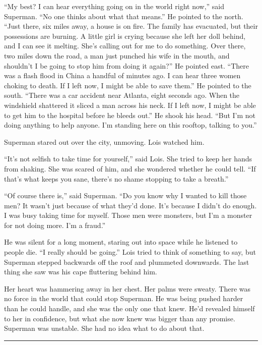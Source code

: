 \documentclass[ebook,12pt]{memoir}
\begin{document}
``My best? I can hear everything going on in the world right now,'' said
Superman. ``No one thinks about what that means.'' He pointed to the
north. ``Just there, six miles away, a house is on fire. The family has
evacuated, but their possessions are burning. A little girl is crying
because she left her doll behind, and I can see it melting. She's
calling out for me to do something. Over there, two miles down the road,
a man just punched his wife in the mouth, and shouldn't I be going to
stop him from doing it again?'' He pointed east. ``There was a flash
flood in China a handful of minutes ago. I can hear three women choking
to death. If I left now, I might be able to save them.'' He pointed to
the south. ``There was a car accident near Atlanta, eight seconds ago.
When the windshield shattered it sliced a man across his neck. If I left
now, I might be able to get him to the hospital before he bleeds out.''
He shook his head. ``But I'm not doing anything to help anyone. I'm
standing here on this rooftop, talking to you.''

Superman stared out over the city, unmoving. Lois watched him.

``It's not selfish to take time for yourself,'' said Lois. She tried to
keep her hands from shaking. She was scared of him, and she wondered
whether he could tell. ``If that's what keeps you sane, there's no shame
stopping to take a breath.''

``Of course there is,'' said Superman. ``Do you know why I wanted to
kill those men? It wasn't just because of what they'd done. It's because
I didn't do enough. I was busy taking time for myself. Those men were
monsters, but I'm a monster for not doing more. I'm a fraud.''

He was silent for a long moment, staring out into space while he
listened to people die. ``I really should be going.'' Lois tried to
think of something to say, but Superman stepped backwards off the roof
and plummeted downwards. The last thing she saw was his cape fluttering
behind him.

Her heart was hammering away in her chest. Her palms were sweaty. There
was no force in the world that could stop Superman. He was being pushed
harder than he could handle, and she was the only one that knew. He'd
revealed himself to her in confidence, but what she now knew was bigger
than any promise. Superman was unstable. She had no idea what to do
about that.

\begin{center}\rule{0.5\linewidth}{\linethickness}\end{center}
\end{document}
